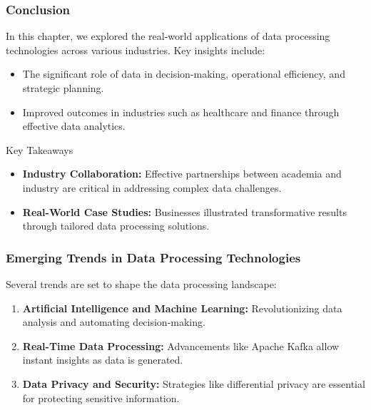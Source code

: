 \documentclass{beamer}
\begin{document}
\begin{frame}[fragile]
    \frametitle{Conclusion}
    In this chapter, we explored the real-world applications of data processing technologies across various industries. Key insights include:

    \begin{itemize}
        \item The significant role of data in decision-making, operational efficiency, and strategic planning.
        \item Improved outcomes in industries such as healthcare and finance through effective data analytics.
    \end{itemize}
    
    \begin{block}{Key Takeaways}
        \begin{itemize}
            \item \textbf{Industry Collaboration:} Effective partnerships between academia and industry are critical in addressing complex data challenges.
            \item \textbf{Real-World Case Studies:} Businesses illustrated transformative results through tailored data processing solutions.
        \end{itemize}
    \end{block}
\end{frame}

\begin{frame}[fragile]
    \frametitle{Emerging Trends in Data Processing Technologies}
    Several trends are set to shape the data processing landscape:

    \begin{enumerate}
        \item \textbf{Artificial Intelligence and Machine Learning:} Revolutionizing data analysis and automating decision-making.
        \item \textbf{Real-Time Data Processing:} Advancements like Apache Kafka allow instant insights as data is generated.
        \item \textbf{Data Privacy and Security:} Strategies like differential privacy are essential for protecting sensitive information.
    \end{enumerate}
\end{frame}
\end{document}
